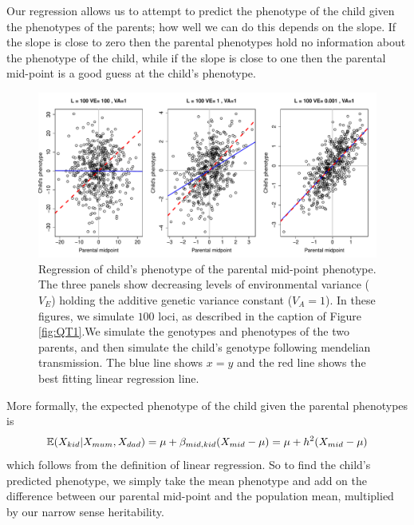 Our regression allows us to attempt to predict the phenotype of the
child given the phenotypes of the parents; how well we can do this depends on the
slope. If the slope is close to zero then the parental phenotypes hold no
information about the phenotype of the child, while if the slope is
close to one then the parental mid-point is a good guess at the child's
phenotype.\\
\begin{figure}
\begin{center}
\includegraphics[width=\textwidth]{figures/QT2.pdf}
\end{center}
\caption{Regression of child's phenotype of the parental mid-point phenotype. The three panels show decreasing levels of environmental
  variance ($V_E$) holding the additive genetic variance constant ($V_A=1$). 
 In these figures, we simulate $100$ loci, as described in
 the caption of Figure \ref{fig:QT1}.We simulate the genotypes and
 phenotypes of the two parents, and then simulate the child's genotype
following mendelian transmission. The blue line shows $x=y$ and the red
line shows the best fitting linear regression line. }
\end{figure}

More formally, the expected phenotype of the child given the parental
phenotypes is
\begin{equation}
\mathbb{E}(X_{kid} | X_{mum},X_{dad}) = \mu +
\beta_{mid,kid}(X_{mid} - \mu) =\mu + h^2(X_{mid} - \mu)  \label{predict_kid}
\end{equation}
which follows from the definition of linear regression. So to find the
child's predicted phenotype, we simply take the mean phenotype and add on the difference between our parental mid-point and the population mean, multiplied by our
narrow sense heritability. \\


\begin{question}
\end{question}


